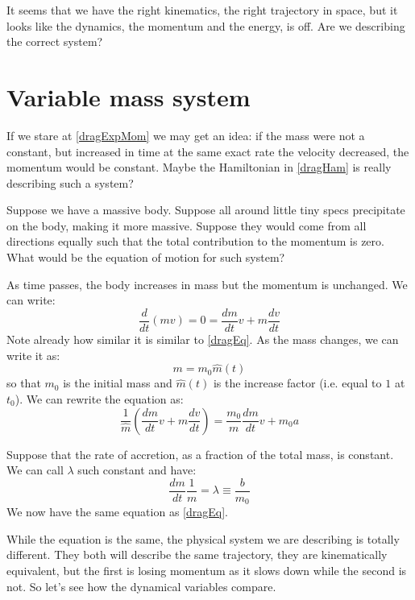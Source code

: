 \documentclass[aps,pra,10pt,twocolumn,floatfix,nofootinbib]{revtex4-1}
\theoremstyle{definition}
\begin{document}
It seems that we have the right kinematics, the right trajectory in space, but it looks like the dynamics, the momentum and the energy, is off. Are we describing the correct system?

\section{Variable mass system}

If we stare at \eqref{dragExpMom} we may get an idea: if the mass were not a constant, but increased in time at the same exact rate the velocity decreased, the momentum would be constant. Maybe the Hamiltonian in \eqref{dragHam} is really  describing such a system?

Suppose we have a massive body. Suppose all around little tiny specs precipitate on the body, making it more massive. Suppose they would come from all directions equally such that the total contribution to the momentum is zero. What would be the equation of motion for such system?

As time passes, the body increases in mass but the momentum is unchanged. We can write:
\begin{equation}
\label{accFma}
\frac{d}{dt}(m v) = 0 = \frac{dm}{dt}v + m \frac{dv}{dt}
\end{equation}
Note already how similar it is similar to \eqref{dragEq}. As the mass changes, we can write it as:
\begin{equation}
m = m_0 \hat{m}(t)
\end{equation}
so that $m_0$ is the initial mass and $\hat{m}(t)$ is the increase factor (i.e. equal to $1$ at $t_0$). We can rewrite the equation as:
\begin{equation*}
\frac{1}{\hat{m}} (\frac{dm}{dt}v + m \frac{dv}{dt}) = \frac{m_0}{m}\frac{dm}{dt}v + m_0 a
\end{equation*}

Suppose that the rate of accretion, as a fraction of the total mass, is constant. We can call $\lambda$ such constant and have:
\begin{equation}
\label{accMass}
\frac{dm}{dt} \frac{1}{m} = \lambda \equiv \frac{b}{m_0}
\end{equation}
We now have the same equation as \eqref{dragEq}.

While the equation is the same, the physical system we are describing is totally different. They both will describe the same trajectory, they are kinematically equivalent, but the first is losing momentum as it slows down while the second is not. So let's see how the dynamical variables compare.
\end{document}
